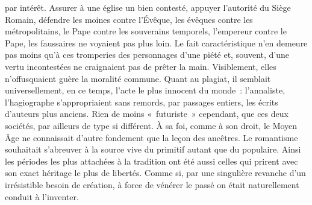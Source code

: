 \documentclass[french,twoside]{book} %
\newcommand{\astermono}{\medskip\centerline{\color{rubric}\large\selectfont{\syms ✻}}\medskip\par}%
\begin{document}
\label{p44} par intérêt. Assurer à une église un bien contesté, appuyer l’autorité du Siège Romain, défendre les moines contre l’Évêque, les évêques contre les métropolitains, le Pape contre les souverains temporels, l’empereur contre le Pape, les faussaires ne voyaient pas plus loin. Le fait caracté­ristique n’en demeure pas moins qu’à ces tromperies des personnages d’une piété et, souvent, d’une vertu incontestées ne craignaient pas de prêter la main. Visiblement, elles n’offusquaient guère la moralité com­mune. Quant au plagiat, il semblait universellement, en ce temps, l’acte le plus innocent du monde : l’annaliste, l’hagiographe s’appropriaient sans remords, par passages entiers, les écrits d’auteurs plus anciens. Rien de moins « futuriste » cependant, que ces deux sociétés, par ailleurs de type si différent. À sa foi, comme à son droit, le Moyen Âge ne connaissait d’autre fondement que la leçon des ancêtres. Le romantisme souhaitait s’abreuver à la source vive du primitif autant que du populaire. Ainsi les périodes les plus attachées à la tradition ont été aussi celles qui prirent avec son exact héritage le plus de libertés. Comme si, par une singulière revanche d’un irrésistible besoin de création, à force de vénérer le passé on était naturellement conduit à l’inventer.\par

\astermono
\end{document}
